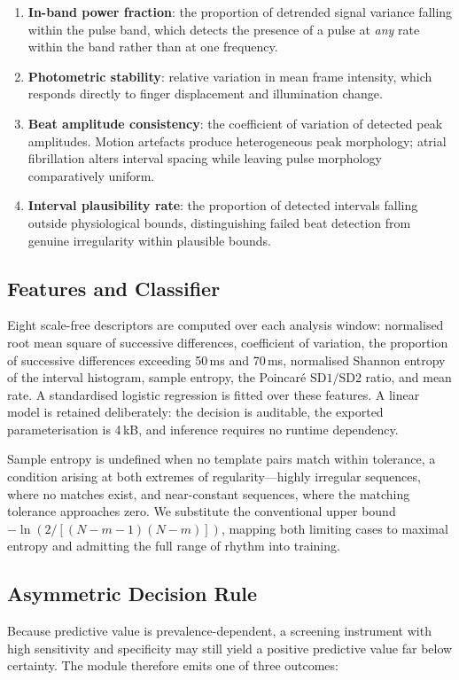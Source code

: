 \documentclass[conference]{IEEEtran}
\begin{document}
\begin{enumerate}
\item \textbf{In-band power fraction}: the proportion of detrended signal variance
      falling within the pulse band, which detects the presence of a pulse at
      \emph{any} rate within the band rather than at one frequency.
\item \textbf{Photometric stability}: relative variation in mean frame intensity,
      which responds directly to finger displacement and illumination change.
\item \textbf{Beat amplitude consistency}: the coefficient of variation of detected
      peak amplitudes. Motion artefacts produce heterogeneous peak morphology;
      atrial fibrillation alters interval spacing while leaving pulse morphology
      comparatively uniform.
\item \textbf{Interval plausibility rate}: the proportion of detected intervals
      falling outside physiological bounds, distinguishing failed beat detection
      from genuine irregularity within plausible bounds.
\end{enumerate}

\subsection{Features and Classifier}
Eight scale-free descriptors are computed over each analysis window: normalised
root mean square of successive differences, coefficient of variation, the
proportion of successive differences exceeding 50\,ms and 70\,ms, normalised
Shannon entropy of the interval histogram, sample entropy, the Poincar\'e
$\mathrm{SD1}/\mathrm{SD2}$ ratio, and mean rate. A standardised logistic
regression is fitted over these features. A linear model is retained deliberately:
the decision is auditable, the exported parameterisation is 4\,kB, and inference
requires no runtime dependency.

Sample entropy is undefined when no template pairs match within tolerance, a
condition arising at both extremes of regularity---highly irregular sequences, where
no matches exist, and near-constant sequences, where the matching tolerance
approaches zero. We substitute the conventional upper bound
$-\ln\!\left(2/[(N{-}m{-}1)(N{-}m)]\right)$, mapping both limiting cases to maximal
entropy and admitting the full range of rhythm into training.

\subsection{Asymmetric Decision Rule}
\label{sec:asym}
Because predictive value is prevalence-dependent, a screening instrument with
high sensitivity and specificity may still yield a positive predictive value far
below certainty. The module therefore emits one of three outcomes:
\end{document}
